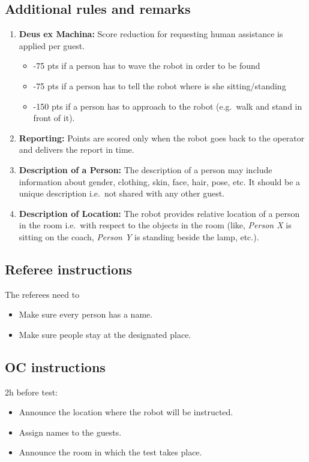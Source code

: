 \subsection{Additional rules and remarks}
\begin{enumerate}[nosep]
	\item \textbf{Deus ex Machina:} Score reduction for requesting human assistance is applied per guest.
	\begin{itemize}
		\item -75 pts if a person has to wave the robot in order to be found
		\item -75 pts if a person has to tell the robot where is she sitting/standing
		\item -150 pts if a person has to approach to the robot (e.g.~walk and stand in front of it).
	\end{itemize}

	\item \textbf{Reporting:} Points are scored only when the robot goes back to the operator and delivers the report in time.

	\item \textbf{Description of a Person:} The description of a person may include information about gender, clothing, skin, face, hair, pose, etc. It should be a unique description i.e.~not shared with any other guest.

	\item \textbf{Description of Location:} The robot provides relative location of a person in the room i.e.~with respect to the objects in the room (like, \textit{Person X} is sitting on the coach, \textit{Person Y} is standing beside the lamp, etc.).
\end{enumerate}


\subsection{Referee instructions}

The referees need to
\begin{itemize}
	\item Make sure every person has a name.
	\item Make sure people stay at the designated place.
\end{itemize}

\subsection{OC instructions}

2h before test:
\begin{itemize}
	\item Announce the location where the robot will be instructed.
	\item Assign names to the guests.
	\item Announce the room in which the test takes place.
\end{itemize}

% 
